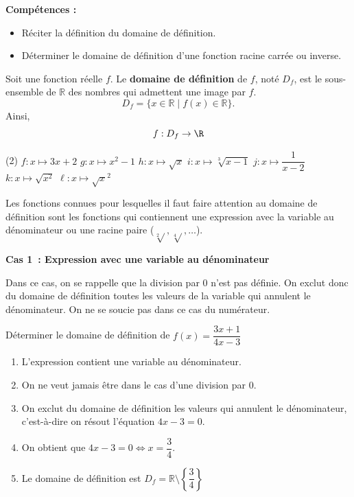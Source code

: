 \documentclass[a4paper,12pt]{report}
\begin{document}
{\bfseries Compétences :}
\begin{itemize}
	\item Réciter la définition du domaine de définition.
	\item Déterminer le domaine de définition d'une fonction racine carrée ou inverse.
\end{itemize}
    
\begin{defi}
	Soit une fonction réelle $f$. Le {\bfseries domaine de définition} de $f$, noté $D_f$, est le sous-ensemble de $\mathbb{R}$ des nombres qui admettent une image par $f$.  
        \[D_f=\{x\in \mathbb{R} \;|\; f(x)\in \mathbb{R}\}.\]
	Ainsi, 
	\[f:D_f\rightarrow \R\]
\end{defi}

\begin{boiteExT}
\begin{tasks}(2)
	\task[] $f:x\mapsto 3x+2$
	\task[] $g:x\mapsto x^2-1$
	\vspace{2cm}
	\task[] $h:x\mapsto \sqrt{x}$
	\task[] $i:x\mapsto \sqrt[3]{x-1}$
	\vspace{3cm}
	\task[] $j:x\mapsto \dfrac{1}{x-2}$
	\task[] $k:x\mapsto \sqrt{x^2}$
	\vspace{4cm}
	\task[] $\ell:x\mapsto \sqrt{x}^2$
	\vspace{3cm}
\end{tasks}
\vspace{20cm}
\end{boiteExT}
\begin{boiteicone}
	Les fonctions connues pour lesquelles il faut faire attention au domaine de définition sont les fonctions qui contiennent une expression avec la variable au dénominateur ou une racine paire ($\sqrt[2]{},\sqrt[4]{},\ldots$).
\end{boiteicone}
\newpage
{\bfseries Cas 1~: Expression avec une variable au dénominateur}
\medskip

Dans ce cas, on se rappelle que la division par $0$ n'est pas définie. On exclut donc du domaine de définition toutes les valeurs de la variable qui annulent le dénominateur. On ne se soucie pas dans ce cas du numérateur.

\begin{center}
	Déterminer le domaine de définition de $f(x)=\dfrac{3x+1}{4x-3}$
\end{center}
\begin{enumerate}
	\item L'expression contient une variable au dénominateur.
	\item On ne veut jamais être dans le cas d'une division par $0$.
	\item On exclut du domaine de définition les valeurs qui annulent le dénominateur, c'est-à-dire on résout l'équation $4x-3=0$.
	\item On obtient que $4x-3=0\iff x=\dfrac{3}{4}$.
	\item Le domaine de définition est $D_f=\mathbb{R}\setminus\left\{\dfrac{3}{4}\right\}$
\end{enumerate}
	
\end{document}

